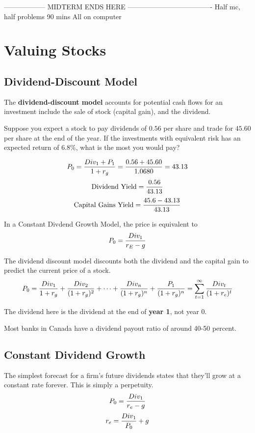 \documentclass[english, 12pt]{article}
\begin{document}
------------------ MIDTERM ENDS HERE -------------------------------------
Half mc, half problems
90 mins
All on computer
\section{Valuing Stocks}

\subsection{Dividend-Discount Model}
The \textbf{dividend-discount model} accounts for potential cash flows for an investment include the sale of stock (capital gain), and the dividend.

\begin{exmp}
Suppose you expect a stock to pay dividends of $0.56$ per share and trade for $45.60$ per share at the end of the year. If the investments with equivalent risk has an expected return of $6.8\%$, what is the most you would pay?
\begin{sol}
\[P_{0} = \frac{Div_{1} + P_{1}}{1 + r_{g}} = \frac{0.56 + 45.60}{1.0680} = 43.13\]
\[\text{Dividend Yield} = \frac{0.56}{43.13}\]
\[\text{Capital Gains Yield} = \frac{45.6 - 43.13}{43.13}\]
\end{sol}
\end{exmp}

\begin{defn}
In a Constant Divdend Growth Model, the price is equivalent to
\[P_{0} = \frac{Div_{1}}{r_{E} - g}\]
\end{defn}

\begin{defn}
The dividend discount model discounts both the dividend and the capital gain to predict the current price of a stock.
\[P_{0} = \frac{Div_{1}}{1 + r_{g}} + \frac{Div_{2}}{(1 + r_{g})^2} + \cdots + \frac{Div_{n}}{(1 + r_{g})^n} + \frac{P_{1}}{(1 + r_{g})^n} = \sum_{t=1}^\infty \frac{Div_t}{(1+r_e)^t}\]
\begin{note}
The dividend here is the dividend at the end of \textbf{year 1}, not year 0.
\end{note}
\end{defn}

\begin{qte}
Most banks in Canada have a dividend payout ratio of around 40-50 percent.
\end{qte}


\subsection{Constant Dividend Growth}
The simplest forecast for a firm's future dividends states that they'll grow at a constant rate forever. This is simply a perpetuity.
\[P_0 = \frac{Div_1}{r_e-g}\]
\[r_e = \frac{Div_1}{P_0} + g\]
\end{document}
